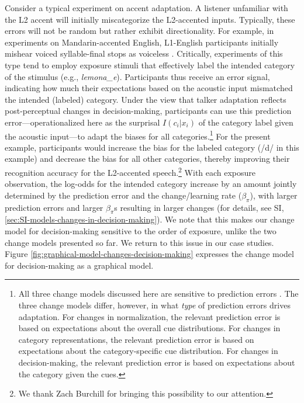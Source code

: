 \documentclass[
  11pt,
  man,floatsintext]{apa6}
\begin{document}
Consider a typical experiment on accent adaptation. A listener unfamiliar with the L2 accent will initially miscategorize the L2-accented inputs. Typically, these errors will not be random but rather exhibit directionality. For example, in experiments on Mandarin-accented English, L1-English participants initially mishear voiced syllable-final stops as voiceless \autocites[e.g., hearing \emph{lid} as \emph{lit},][]{flege1992,xie2016jep}. Critically, experiments of this type tend to employ exposure stimuli that effectively label the intended category of the stimulus (e.g., \emph{lemona\_e}). Participants thus receive an error signal, indicating how much their expectations based on the acoustic input mismatched the intended (labeled) category. Under the view that talker adaptation reflects post-perceptual changes in decision-making, participants can use this prediction error---operationalized here as the surprisal \(I(c_i|x_i)\) of the category label given the acoustic input---to adapt the biases for all categories.\footnote{All three change models discussed here are sensitive to prediction errors \autocite[e.g., for Bayesian belief-updating, sensitivity to the prediction error is a side-effect of optimal information integration, as demonstrated e.g., in][]{jaeger2019}. The three change models differ, however, in what \emph{type} of prediction errors drives adaptation. For changes in normalization, the relevant prediction error is based on expectations about the overall cue distributions. For changes in category representations, the relevant prediction error is based on expectations about the category-specific cue distribution. For changes in decision-making, the relevant prediction error is based on expectations about the category given the cues.} For the present example, participants would increase the bias for the labeled category (/d/ in this example) and decrease the bias for all other categories, thereby improving their recognition accuracy for the L2-accented speech.\footnote{We thank Zach Burchill for bringing this possibility to our attention.} With each exposure observation, the log-odds for the intended category increase by an amount jointly determined by the prediction error and the change/learning rate (\(\beta_{\pi}\)), with larger prediction errors and larger \(\beta_{\pi}\)s resulting in larger changes (for details, see SI, \ref{sec:SI-models-changes-in-decision-making}). We note that this makes our change model for decision-making sensitive to the order of exposure, unlike the two change models presented so far. We return to this issue in our case studies. Figure \ref{fig:graphical-model-changes-decision-making} expresses the change model for decision-making as a graphical model.
\end{document}
